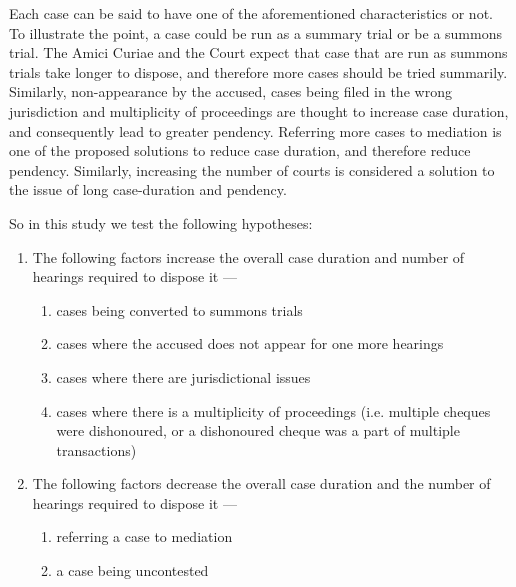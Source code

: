 Each case can be said to have one of the aforementioned characteristics or not. To illustrate the point, a case could be run as a summary trial or be a summons trial. The Amici Curiae and the Court expect that case that are run as summons trials take longer to dispose, and therefore more cases should be tried summarily. Similarly, non-appearance by the accused, cases being filed in the wrong jurisdiction and multiplicity of proceedings are thought to increase case duration, and consequently lead to greater pendency. Referring more cases to mediation is one of the proposed solutions to reduce case duration, and therefore reduce pendency. Similarly, increasing the number of courts is considered a solution to the issue of long case-duration and pendency.

So in this study we test the following hypotheses:
\begin{enumerate}
\item The following factors increase the overall case duration and number of hearings required to dispose it ---
  \begin{enumerate}
  \item cases being converted to summons trials
  \item cases where the accused does not appear for one more hearings
  \item cases where there are jurisdictional issues
  \item cases where there is a multiplicity of proceedings (i.e. multiple cheques were dishonoured, or a dishonoured cheque was a part of multiple transactions)
  \end{enumerate}
\item The following factors decrease the overall case duration and the number of hearings required to dispose it ---
  \begin{enumerate}
  \item referring a case to mediation
  \item a case being uncontested
  \end{enumerate}
\end{enumerate}



